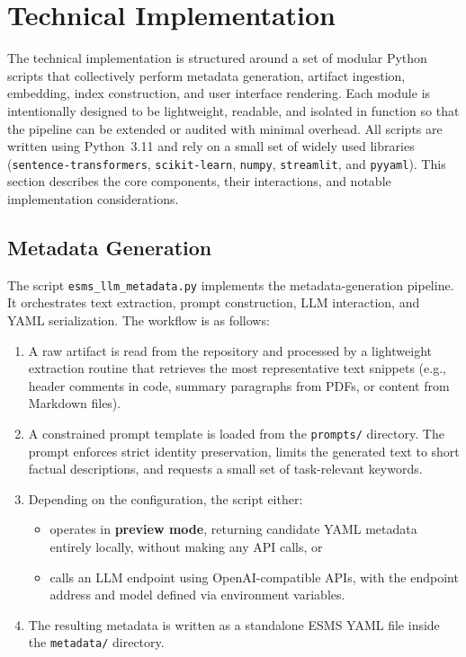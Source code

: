 \documentclass[12pt]{article}
\begin{document}
\section{Technical Implementation}

The technical implementation is structured around a set of modular Python scripts
that collectively perform metadata generation, artifact ingestion, embedding,
index construction, and user interface rendering. Each module is intentionally
designed to be lightweight, readable, and isolated in function so that the 
pipeline can be extended or audited with minimal overhead. All scripts are 
written using Python~3.11 and rely on a small set of widely used libraries 
(\texttt{sentence-transformers}, \texttt{scikit-learn}, \texttt{numpy}, 
\texttt{streamlit}, and \texttt{pyyaml}). This section describes the core 
components, their interactions, and notable implementation considerations.

\subsection{Metadata Generation}

The script \texttt{esms\_llm\_metadata.py} implements the metadata-generation 
pipeline. It orchestrates text extraction, prompt construction, LLM interaction, 
and YAML serialization. The workflow is as follows:

\begin{enumerate}
    \item A raw artifact is read from the repository and processed by a 
    lightweight extraction routine that retrieves the most representative text 
    snippets (e.g., header comments in code, summary paragraphs from PDFs, or 
    content from Markdown files).
    \item A constrained prompt template is loaded from the \texttt{prompts/} 
    directory. The prompt enforces strict identity preservation, limits the 
    generated text to short factual descriptions, and requests a small set of 
    task-relevant keywords.
    \item Depending on the configuration, the script either:
    \begin{itemize}
        \item operates in \textbf{preview mode}, returning candidate YAML 
        metadata entirely locally, without making any API calls, or
        \item calls an LLM endpoint using OpenAI-compatible APIs, with the 
        endpoint address and model defined via environment variables.
    \end{itemize}
    \item The resulting metadata is written as a standalone ESMS YAML file inside 
    the \texttt{metadata/} directory.
\end{enumerate}
\end{document}
